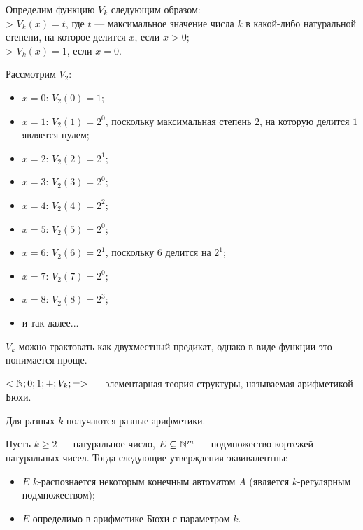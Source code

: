     \begin{Def}[Функция $V_k$]
        Определим функцию $V_k$ следующим образом:\\
        > $V_k(x) = t$, где $t$ --- максимальное значение числа $k$ в какой-либо натуральной степени, на которое делится $x$, если $x > 0$;\\
        > $V_k(x) = 1$, если $x = 0$.
    \end{Def}
    \begin{Example}
        Рассмотрим $V_2$: 
        \begin{itemize}
            \item $x = 0$: $V_2(0) = 1$;
            \item $x = 1$: $V_2(1) = 2^0$, поскольку максимальная степень $2$, на которую делится $1$ является нулем;
            \item $x = 2$: $V_2(2) = 2^1$;
            \item $x = 3$: $V_2(3) = 2^0$;
            \item $x = 4$: $V_2(4) = 2^2$;
            \item $x = 5$: $V_2(5) = 2^0$;
            \item $x = 6$: $V_2(6) = 2^1$, поскольку $6$ делится на $2^1$;
            \item $x = 7$: $V_2(7) = 2^0$;
            \item $x = 8$: $V_2(8) = 2^3$;
            \item и так далее...
        \end{itemize}
    \end{Example}
    \begin{Rem}
        $V_k$ можно трактовать как двухместный предикат, однако в виде функции это понимается проще.
    \end{Rem}
    \begin{Def}
        $<\mathbb{N}; 0; 1; +; V_k; =>$ --- элементарная теория структуры, называемая арифметикой Бюхи.
    \end{Def}
    \begin{Rem}
        Для разных $k$ получаются разные арифметики.
    \end{Rem}
    \begin{Thm}
        Пусть $k \geq 2$ --- натуральное число, $E \subseteq \mathbb{N}^m$ --- подмножество кортежей натуральных чисел. Тогда следующие утверждения эквивалентны:
        \begin{itemize}
            \item $E$ $k$-распознается некоторым конечным автоматом $A$ (является $k$-регулярным подмножеством);
            \item $E$ определимо в арифметике Бюхи с параметром $k$.
        \end{itemize}
    \end{Thm}

